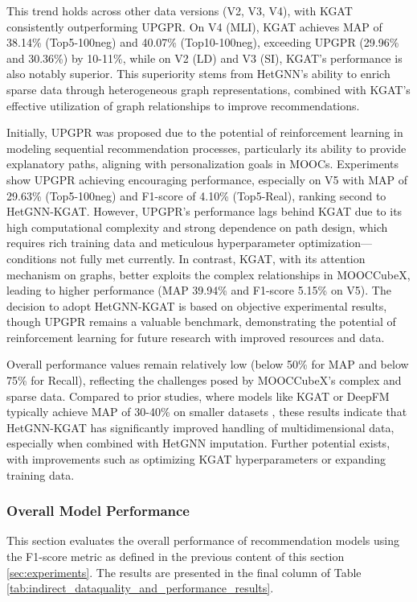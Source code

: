 \documentclass{ieeeaccess}
\begin{document}
This trend holds across other data versions (V2, V3, V4), with KGAT consistently outperforming UPGPR. On V4 (MLI), KGAT achieves MAP of 38.14\% (Top5-100neg) and 40.07\% (Top10-100neg), exceeding UPGPR (29.96\% and 30.36\%) by 10-11\%, while on V2 (LD) and V3 (SI), KGAT's performance is also notably superior. This superiority stems from HetGNN's ability to enrich sparse data through heterogeneous graph representations, combined with KGAT's effective utilization of graph relationships to improve recommendations.

Initially, UPGPR was proposed due to the potential of reinforcement learning in modeling sequential recommendation processes, particularly its ability to provide explanatory paths, aligning with personalization goals in MOOCs. Experiments show UPGPR achieving encouraging performance, especially on V5 with MAP of 29.63\% (Top5-100neg) and F1-score of 4.10\% (Top5-Real), ranking second to HetGNN-KGAT. However, UPGPR's performance lags behind KGAT due to its high computational complexity and strong dependence on path design, which requires rich training data and meticulous hyperparameter optimization—conditions not fully met currently. In contrast, KGAT, with its attention mechanism on graphs, better exploits the complex relationships in MOOCCubeX, leading to higher performance (MAP 39.94\% and F1-score 5.15\% on V5). The decision to adopt HetGNN-KGAT is based on objective experimental results, though UPGPR remains a valuable benchmark, demonstrating the potential of reinforcement learning for future research with improved resources and data.

Overall performance values remain relatively low (below 50\% for MAP and below 75\% for Recall), reflecting the challenges posed by MOOCCubeX's complex and sparse data. Compared to prior studies, where models like KGAT or DeepFM typically achieve MAP of 30-40\% on smaller datasets \cite{wang2019kgat, guo2017deepfm}, these results indicate that HetGNN-KGAT has significantly improved handling of multidimensional data, especially when combined with HetGNN imputation. Further potential exists, with improvements such as optimizing KGAT hyperparameters or expanding training data.

\subsubsection{Overall Model Performance}

This section evaluates the overall performance of recommendation models using the F1-score metric as defined in the previous content of this section \ref{sec:experiments}. The results are presented in the final column of Table \ref{tab:indirect_dataquality_and_performance_results}.
\end{document}
